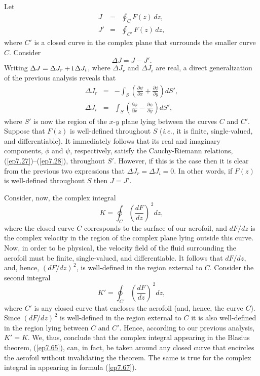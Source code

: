 Let 
\begin{eqnarray}
J&=&\oint_{C}F(z)\,dz,\\[0.5ex]
J'&=&\oint_{C'}  F(z)\,dz,
\end{eqnarray}
where $C'$ is a closed curve in the complex plane that surrounds the smaller curve $C$. 
Consider
\begin{equation}
\Delta J = J-J'.
\end{equation}
Writing $\Delta J=\Delta J_r+{\rm i}\,\Delta J_i$, where $\Delta J_r$ and $\Delta J_i$ are real, a direct generalization of the previous analysis
reveals that
\begin{eqnarray}
\Delta J_r &=&-\int_{S}\left(\frac{\partial\psi}{\partial x} + \frac{\partial\phi}{\partial y}\right)dS',\\[0.5ex]
\Delta J_i&=&\int_{S}\left(\frac{\partial\phi}{\partial x} - \frac{\partial\psi}{\partial y}\right)dS',
\end{eqnarray}
where $S'$ is now the region of the $x$-$y$ plane lying between the curves $C$ and $C'$. 
Suppose that $F(z)$ is well-defined throughout $S$ ({\em i.e.}, it is finite, single-valued, and
differentiable). It immediately follows that its real and imaginary components, $\phi$ and $\psi$,
respectively, satisfy the Cauchy-Riemann relations, (\ref{ep7.27})--(\ref{ep7.28}), throughout $S'$. 
However, if this is the case then it is clear from the previous two expressions that $\Delta J_r=\Delta J_i=0$. 
In other words, if $F(z)$ is well-defined throughout $S$ then $J=J'$. 

Consider, now, the complex integral
\begin{equation}
K=\oint_C \left(\frac{dF}{dz}\right)^{\,2}dz,
\end{equation}
where the closed curve $C$ corresponds to the surface of our aerofoil, and $dF/dz$ is the complex velocity
in the region of the complex plane lying outside this curve. Now, in order to be physical,  the velocity field of the fluid
surrounding the aerofoil must be finite, single-valued, and differentiable. It follows that $dF/dz$, and, hence,
$(dF/dz)^{\,2}$, is well-defined in the region external to $C$. 
Consider the second integral
\begin{equation}
K'=\oint_{C'} \left(\frac{dF}{dz}\right)^{\,2}dz,
\end{equation}
where $C'$ is any closed curve that encloses the aerofoil (and, hence, the curve $C$). Since $(dF/dz)^{\,2}$
is well-defined in the region external to $C$ it is also well-defined in the region lying between $C$ and $C'$. 
Hence, according to our previous analysis, $K'=K$. We, thus, conclude that the complex integral appearing in the
Blasius theorem, (\ref{ep7.65}), can, in fact, be taken around any closed curve that encircles the aerofoil
without invalidating the theorem. The same is true for the complex integral in appearing in formula (\ref{ep7.67}).

